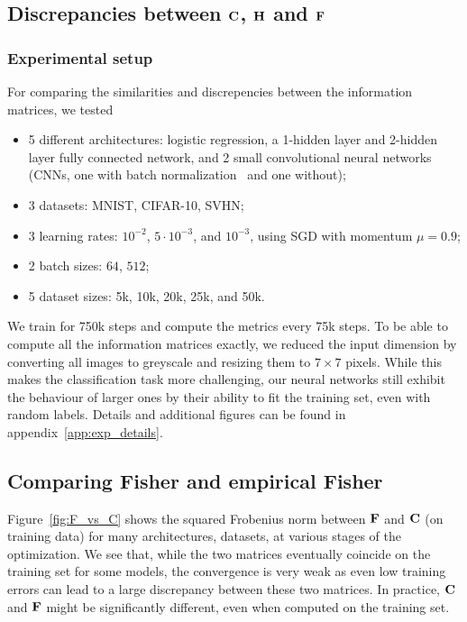 \subsection{Discrepancies between \texorpdfstring{${\mathbf{C}}$}{C}, \texorpdfstring{${\mathbf{H}}$}{H} and \texorpdfstring{${\mathbf{F}}$}{F}}
\label{sec:exp_hfc}

\subsubsection{Experimental setup}
\label{sec:exp_setup_hfc}
For comparing the similarities and discrepencies between the information matrices, we tested
\begin{itemize}
    \item 5 different architectures: logistic regression, a 1-hidden layer and 2-hidden layer fully connected network, and 2 small convolutional neural networks (CNNs, one with batch normalization~\citep{ioffe2015batch} and one without);
    \item 3 datasets: MNIST, CIFAR-10, SVHN;
    \item 3 learning rates: $10^{-2}$, $5\cdot 10^{-3}$, and $10^{-3}$, using SGD with momentum $\mu = 0.9$;
    \item 2 batch sizes: $64$, $512$;
    \item 5 dataset sizes: 5k, 10k, 20k, 25k, and 50k.
\end{itemize}
We train for 750k steps and compute the metrics every 75k steps. To be able to compute all the information matrices exactly, we reduced the input dimension by converting all images to greyscale and resizing them to $7 \times 7$ pixels. While this makes the classification task more challenging, our neural networks still exhibit the behaviour of larger ones by their ability to fit the training set, even with random labels. Details and additional figures can be found in appendix~\ref{app:exp_details}.

\subsection{Comparing Fisher and empirical Fisher}

Figure~\ref{fig:F_vs_C} shows the squared Frobenius norm between ${\mathbf{F}}$ and ${\mathbf{C}}$ (on training data) for many architectures, datasets, at various stages of the optimization. We see that, while the two matrices eventually coincide on the training set for some models, the convergence is very weak as even low training errors can lead to a large discrepancy between these two matrices. In practice, ${\mathbf{C}}$ and ${\mathbf{F}}$ might be significantly different, even when computed on the training set.

